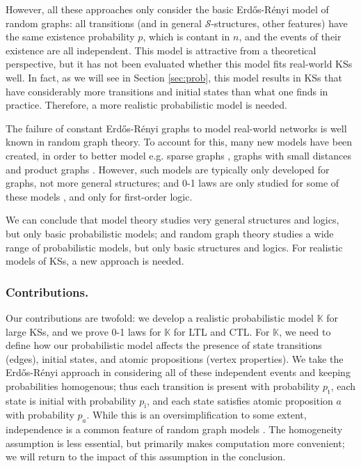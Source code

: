 \documentclass[runngingheads]{llncs}
\newcommand\recht\operatorname
\begin{document}
However, all these approaches only consider the basic Erd\H{o}s-Rényi model of random graphs: all transitions (and in general $\mathcal{S}$-structures, other features) have the same existence probability $p$, which is contant in $n$, and the events of their existence are all independent. This model is attractive from a theoretical perspective, but it has not been evaluated whether this model fits real-world KSs well. In fact, as we will see in Section \ref{sec:prob}, this model results in KSs that have considerably more transitions and initial states than what one finds in practice. Therefore, a more realistic probabilistic model is needed.

The failure of constant Erd\H{o}s-Rényi graphs to model real-world networks is well known in random graph theory. To account for this, many new models have been created, in order to better model e.g. sparse graphs \cite{hofstad2017random}, graphs with small distances \cite{barabasi1999emergence} and product graphs \cite{leskovec2010kronecker}. However, such models are typically only developed for graphs, not more general structures; and 0-1 laws are only studied for some of these models \cite{shelah1988zero}, and only for first-order logic.

We can conclude that model theory studies very general structures and logics, but only basic probabilistic models; and random graph theory studies a wide range of probabilistic models, but only basic structures and logics. For realistic models of KSs, a new approach is needed.

\subsubsection{Contributions.} Our contributions are twofold: we develop a realistic probabilistic model $\mathbb{K}$ for large KSs, and we prove 0-1 laws for $\mathbb{K}$ for LTL and CTL. For $\mathbb{K}$, we need to define how our probabilistic model affects the presence of state transitions (edges), initial states, and atomic propositions (vertex properties). We take the Erd\H{o}s-Rényi approach in considering all of these independent events and keeping probabilities homogenous; thus each transition is present with probability $p_{\recht{t}}$, each state is initial with probability $p_{\recht{i}}$, and each state satisfies atomic proposition $a$ with probability $p_a$. While this is an oversimplification to some extent, independence is a common feature of random graph models \cite{bollobas2007phase,leskovec2010kronecker,hofstad2024random}. The homogeneity assumption is less essential, but primarily makes computation more convenient; we will return to the impact of this assumption in the conclusion.
\end{document}
